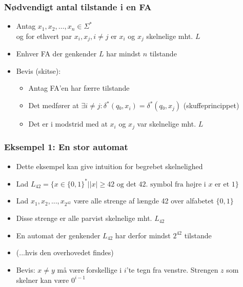 \documentclass[]{beamer}
\begin{document}
\begin{frame}
  \frametitle{Nødvendigt antal tilstande i en FA}
  \begin{itemize}
  \item Antag $x_1, x_2, …, x_n∈ Σ^*$ \\
    og for ethvert par $x_i,x_j, i≠j$
    er $x_i$ og $x_j$ skelnelige mht. $L$
  \item Enhver FA der genkender $L$ har mindst
    $n$ tilstande
  \item Bevis (skitse):
\begin{itemize}[<+->]
\item Antag FA'en har færre tilstande
\item Det medfører at $∃i≠j: δ^*(q₀,x_i)=δ^*(q₀,x_j)$ (skuffeprincippet)
\item Det er i modstrid med at $x_i$ og $x_j$ var skelnelige mht. $L$
\end{itemize}
  \end{itemize}
\end{frame}


\begin{frame}
  \frametitle{Eksempel 1: En stor automat}
  \begin{itemize}[<+->]
\item Dette eksempel kan give intuition for begrebet skelnelighed
  \item Lad $L_{42} = \{ x∈\{0,1\}^* | |x|≥42\text{ og det 42. symbol
                           fra højre i $x$ er et }1 \}$
\item Lad $x_1, x_2, ..., x_{2^{42}}$ være alle strenge af længde 42
over alfabetet $\{0,1\}$
\item Disse strenge er alle parvist skelnelige mht. $L_{42}$
\item En automat der genkender $L_{42}$ har derfor
mindst $2^{42}$ tilstande
\item (...hvis den overhovedet findes)
\item Bevis: $x≠y$ må være forskellige i $i$'te tegn fra venstre.
  Strengen $z$ som skelner kan være $0^{i-1}$
\end{itemize}
\end{frame}
\end{document}
